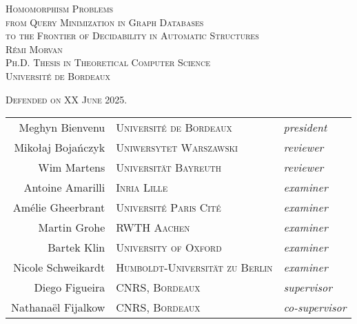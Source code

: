 \begin{titlepage}
\begin{center}
  \Huge\scshape{%
  Homomorphism Problems}\\[.4cm]
  \Large\scshape{%
  from Query Minimization in Graph Databases\\[.2cm]to the Frontier of Decidability in Automatic Structures}\\
  \vspace{4em}
  \normalfont\LARGE{} Rémi Morvan\\[1em]
  \Large\scshape
  Ph.D. Thesis in Theoretical Computer Science\\
  \textcolor{maincolor}{Université de Bordeaux}
  \vfill
  \begin{center}
    \normalfont\Large\scshape Defended on XX June 2025.\\[1.5em]
    \normalfont
    \begin{tabular}{rll}
      Meghyn Bienvenu & \textsc{\small Université de Bordeaux} & \emph{president}\\[.5em]
      Mikołaj Bojańczyk & \textsc{\small Uniwersytet Warszawski} & \emph{reviewer}\\
      Wim Martens & \textsc{\small Universität Bayreuth} & \emph{reviewer} \\[.5em]
      Antoine Amarilli & \textsc{\small Inria Lille} & \emph{examiner}\\
      Amélie Gheerbrant & \textsc{\small Université Paris Cité} & \emph{examiner}\\
      Martin Grohe & \textsc{\small RWTH Aachen} & \emph{examiner}\\
      Bartek Klin & \textsc{\small University of Oxford} & \emph{examiner}\\
      Nicole Schweikardt & \textsc{\small Humboldt-Universität zu Berlin} & \emph{examiner}\\[.5em]
      Diego Figueira & \textsc{\small CNRS, Bordeaux} & \emph{supervisor}\\
      Nathanaël Fijalkow & \textsc{\small CNRS, Bordeaux} & \emph{co-supervisor}
    \end{tabular}
  \end{center}
\end{center}
\end{titlepage}
\restoregeometry